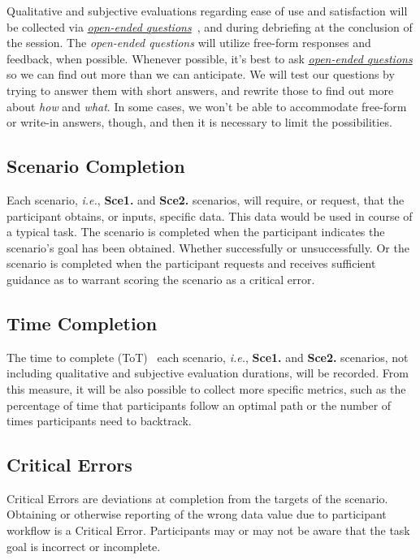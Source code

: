 Qualitative and subjective evaluations regarding ease of use and satisfaction will be collected via {\it \hyperlink{https://www.nngroup.com/articles/open-ended-questions/}{open-ended questions}}~\cite{abelson2016supporting, merchant2018digital}, and during debriefing at the conclusion of the session.  The {\it open-ended questions} will utilize free-form responses and feedback, when possible. Whenever possible, it's best to ask {\it \hyperlink{https://www.nngroup.com/articles/open-ended-questions/}{open-ended questions}} so we can find out more than we can anticipate. We will test our questions by trying to answer them with short answers, and rewrite those to find out more about {\it how} and {\it what}. In some cases, we won't be able to accommodate free-form or write-in answers, though, and then it is necessary to limit the possibilities.

\subsection{Scenario Completion}

Each scenario, {\it i.e.}, {\bf Sce1.} and {\bf Sce2.} scenarios, will require, or request, that the participant obtains, or inputs, specific data. This data would be used in course of a typical task. The scenario is completed when the participant indicates the scenario's goal has been obtained. Whether successfully or unsuccessfully. Or the scenario is completed when the participant requests and receives sufficient guidance as to warrant scoring the scenario as a critical error.

\subsection{Time Completion}

The time to complete (ToT)~\cite{delgado2017time, huang2018impact} each scenario, {\it i.e.}, {\bf Sce1.} and {\bf Sce2.} scenarios, not including qualitative and subjective evaluation durations, will be recorded. From this measure, it will be also possible to collect more specific metrics, such as the percentage of time that participants follow an optimal path or the number of times participants need to backtrack.

\subsection{Critical Errors}

Critical Errors are deviations at completion from the targets of the scenario. Obtaining or otherwise reporting of the wrong data value due to participant workflow is a Critical Error. Participants may or may not be aware that the task goal is incorrect or incomplete.

